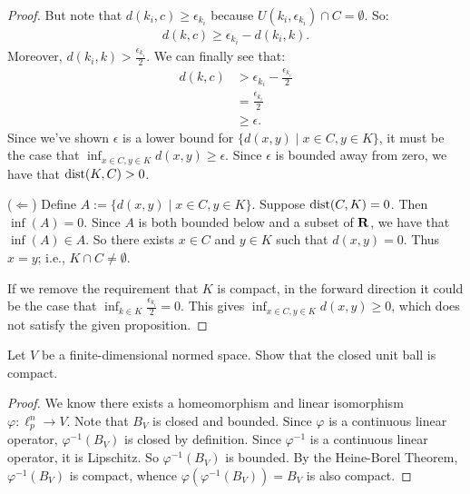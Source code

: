 \documentclass[11pt,twoside,openany]{memoir}
\begin{document}
\begin{exercise}
\begin{proof}
                    But note that $d(k_i,c) \geq \epsilon_{k_i}$ because $U(k_i,\epsilon_{k_i}) \cap C = \emptyset$. So:
                        \begin{equation*}
                        \begin{split}
                            d(k,c) \geq \epsilon_{k_i} - d(k_i,k).
                        \end{split}
                        \end{equation*}
                    Moreover, $d(k_i,k) > \frac{\epsilon_{k_i}}{2}$. We can finally see that:
                        \begin{equation*}
                        \begin{split}
                            d(k,c)
                            & > \epsilon_{k_i} - \frac{\epsilon_{k_i}}{2} \\
                            & = \frac{\epsilon_{k_i}}{2} \\
                            & \geq \epsilon.
                        \end{split}
                        \end{equation*}
                    Since we've shown $\epsilon$ is a lower bound for $\{d(x,y) \mid x \in C, y \in K\}$, it must be the case that $\inf_{x \in C, y\in K}d(x,y) \geq \epsilon$. Since $\epsilon$ is bounded away from zero, we have that $\operatorname{dist}(K,C) > 0$.

                    ($\Leftarrow$) Define $A := \{d(x,y) \mid x \in C, y \in K\}$. Suppose $\operatorname{dist}(C,K) = 0$. Then $\inf(A) = 0$. Since $A$ is both bounded below and a subset of $\mathbf{R}$, we have that $\inf(A) \in A$. So there exists $x \in C$ and $y \in K$ such that $d(x,y) = 0$. Thus $x = y$; i.e., $K \cap C \neq \emptyset$.

                    If we remove the requirement that $K$ is compact, in the forward direction it could be the case that $\inf_{k \in K}\frac{\epsilon_{k_i}}{2} = 0$. This gives $\inf_{x \in C, y\in K}d(x,y) \geq 0$, which does not satisfy the given proposition.
                \end{proof}
    \end{exercise}
    \begin{exercise}
        Let $V$ be a finite-dimensional normed space. Show that the closed unit ball is compact.
    \end{exercise}
        \begin{proof}
            We know there exists a homeomorphism and linear isomorphism $\varphi:\ell_p^n \rightarrow V$. Note that $B_V$ is closed and bounded. Since $\varphi$ is a continuous linear operator, $\varphi^{-1}(B_V)$ is closed by definition. Since $\varphi^{-1}$ is a continuous linear operator, it is Lipschitz. So $\varphi^{-1}(B_V)$ is bounded. By the Heine-Borel Theorem, $\varphi^{-1}(B_V)$ is compact, whence $\varphi(\varphi^{-1}(B_V)) = B_V$ is also compact.
        \end{proof}
\end{document}

